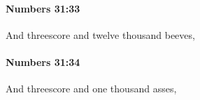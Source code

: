 		\paragraph{Numbers 31:33} %
			\label{NUMBERS-31-33}

			And threescore and twelve thousand beeves,


		\paragraph{Numbers 31:34} %
			\label{NUMBERS-31-34}

			And threescore and one thousand asses,



